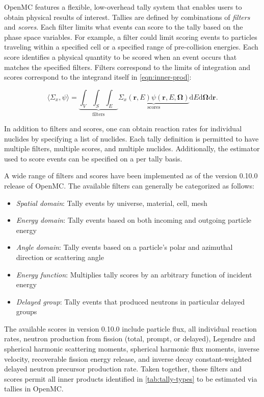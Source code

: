 OpenMC features a flexible, low-overhead tally system that enables users to obtain physical results of interest. Tallies are defined by combinations of \emph{filters} and \emph{scores}. Each filter limits what events can score to the tally based on the phase space variables. For example, a filter could limit scoring events to particles traveling within a specified cell or a specified range of pre-collision energies. Each score identifies a physical quantity to be scored when an event occurs that matches the specified filters. Filters correspond to the limits of integration and scores correspond to the integrand itself in \cref{eqn:inner-prod}:

\begin{equation}
\langle \Sigma_x, \psi \rangle = \underbrace{\int_{V} \int_{S} \int_{E}}_{\text{filters}} \underbrace{\Sigma_{x}(\mathbf{r},E)\psi(\mathbf{r},E,\mathbf{\Omega})}_{\text{scores}} \mathrm{d}E\mathrm{d}\mathbf{\Omega}\mathrm{d}\mathbf{r}.
\end{equation}

In addition to filters and scores, one can obtain reaction rates for individual nuclides by specifying a list of nuclides. Each tally definition is permitted to have multiple filters, multiple scores, and multiple nuclides. Additionally, the estimator used to score events can be specified on a per tally basis.

A wide range of filters and scores have been implemented as of the version 0.10.0 release of OpenMC\cite{openmc-090}. The available filters can generally be categorized as follows:
\begin{itemize}[noitemsep]
\item \emph{Spatial domain}: Tally events by universe, material, cell, mesh
\item \emph{Energy domain}: Tally events based on both incoming and outgoing particle energy
\item \emph{Angle domain}: Tally events based on a particle's polar and azimuthal direction or scattering angle
\item \emph{Energy function}: Multiplies tally scores by an arbitrary function of incident energy
\item \emph{Delayed group}: Tally events that produced neutrons in particular delayed groups
\end{itemize}
The available scores in version 0.10.0 include particle flux, all individual reaction rates, neutron production from fission (total, prompt, or delayed), Legendre and spherical harmonic scattering moments, spherical harmonic flux moments, inverse velocity, recoverable fission energy release, and inverse decay constant-weighted delayed neutron precursor production rate. Taken together, these filters and scores permit all inner products identified in \cref{tab:tally-types} to be estimated via tallies in OpenMC.

